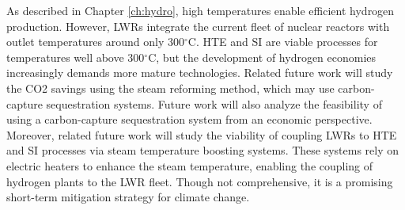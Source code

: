 As described in Chapter \ref{ch:hydro}, high temperatures enable efficient hydrogen production.
However, LWRs integrate the current fleet of nuclear reactors with outlet temperatures around only 300$^{\circ}$C.
HTE and SI are viable processes for temperatures well above 300$^{\circ}$C, but the development of hydrogen economies increasingly demands more mature technologies.
Related future work will study the \gls{CO2} savings using the steam reforming method, which may use carbon-capture sequestration systems.
Future work will also analyze the feasibility of using a carbon-capture sequestration system from an economic perspective.
Moreover, related future work will study the viability of coupling LWRs to HTE and SI processes via steam temperature boosting systems.
These systems rely on electric heaters to enhance the steam temperature, enabling the coupling of hydrogen plants to the LWR fleet.
Though not comprehensive, it is a promising short-term mitigation strategy for climate change.
